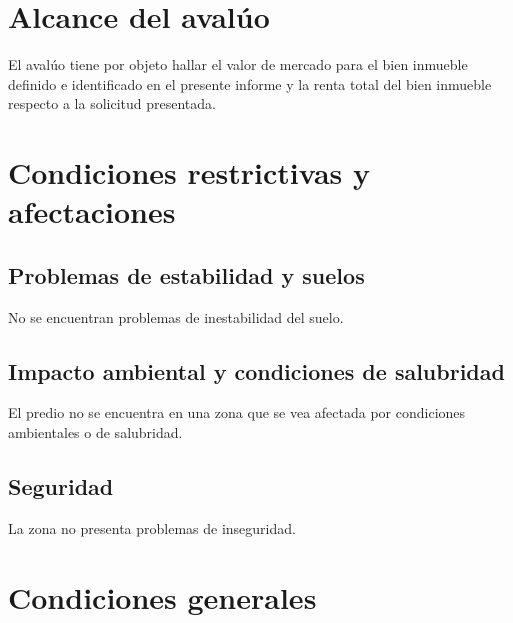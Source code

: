 \documentclass[12pt,a4paper,twoside]{article}
\begin{document}
{\section{Alcance del avalúo}

El avalúo tiene por objeto hallar el valor de mercado para el bien inmueble definido e identificado en el presente informe y la renta total del bien inmueble respecto a la solicitud presentada.

\section{Condiciones restrictivas y afectaciones}

\subsection{Problemas de estabilidad y suelos}

No se encuentran problemas de inestabilidad del suelo.

\subsection{Impacto ambiental y condiciones de salubridad}

El predio no se encuentra en una zona que se vea afectada por condiciones ambientales o de salubridad.



\subsection{Seguridad}

La zona no presenta problemas de inseguridad.

\section{Condiciones generales}

}
\end{document}
